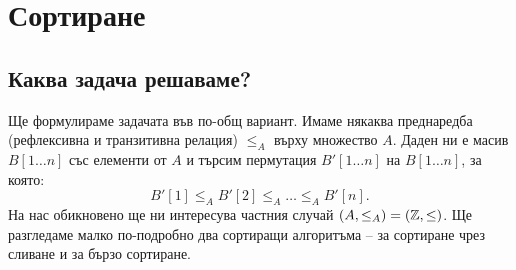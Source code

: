 \chapter{Сортиране}

\section{Каква задача решаваме?}

Ще формулираме задачата във по-общ вариант.
Имаме някаква преднаредба (рефлексивна и транзитивна релация) $\leq_A$ върху множество $A$.
Даден ни е масив $B[1 \dots n]$ със елементи от $A$ и търсим пермутация $B'[1 \dots n]$ на $B[1 \dots n]$, за която:
\[
    B'[1] \leq_A B'[2] \leq_A \dots \leq_A B'[n].
\]
На нас обикновено ще ни интересува частния случай $(A, \leq_A) = (\mathbb{Z}, \leq)$.
Ще разгледаме малко по-подробно два сортиращи алгоритъма -- за сортиране чрез сливане и за бързо сортиране.

